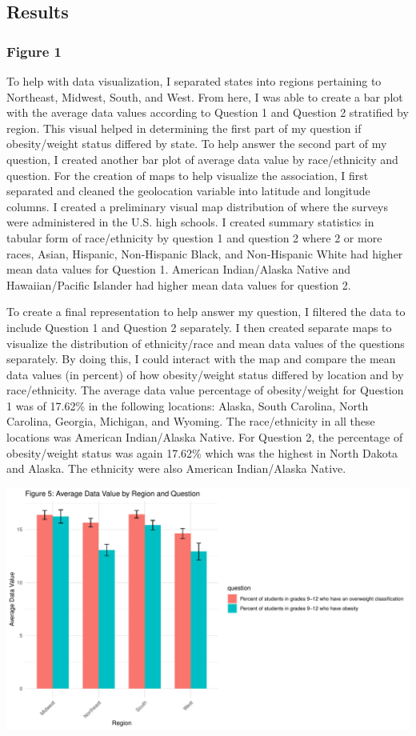 \documentclass[
  letterpaper,
  DIV=11,
  numbers=noendperiod]{scrartcl}
\begin{document}
\subsection{Results}\label{results}

\subsubsection{Figure 1}\label{figure-1}

To help with data visualization, I separated states into regions
pertaining to Northeast, Midwest, South, and West. From here, I was able
to create a bar plot with the average data values according to Question
1 and Question 2 stratified by region. This visual helped in determining
the first part of my question if obesity/weight status differed by
state. To help answer the second part of my question, I created another
bar plot of average data value by race/ethnicity and question. For the
creation of maps to help visualize the association, I first separated
and cleaned the geolocation variable into latitude and longitude
columns. I created a preliminary visual map distribution of where the
surveys were administered in the U.S. high schools. I created summary
statistics in tabular form of race/ethnicity by question 1 and question
2 where 2 or more races, Asian, Hispanic, Non-Hispanic Black, and
Non-Hispanic White had higher mean data values for Question 1. American
Indian/Alaska Native and Hawaiian/Pacific Islander had higher mean data
values for question 2.

To create a final representation to help answer my question, I filtered
the data to include Question 1 and Question 2 separately. I then created
separate maps to visualize the distribution of ethnicity/race and mean
data values of the questions separately. By doing this, I could interact
with the map and compare the mean data values (in percent) of how
obesity/weight status differed by location and by race/ethnicity. The
average data value percentage of obesity/weight for Question 1 was of
17.62\% in the following locations: Alaska, South Carolina, North
Carolina, Georgia, Michigan, and Wyoming. The race/ethnicity in all
these locations was American Indian/Alaska Native. For Question 2, the
percentage of obesity/weight status was again 17.62\% which was the
highest in North Dakota and Alaska. The ethnicity were also American
Indian/Alaska Native.

\includegraphics{PM566---Final_files/figure-pdf/unnamed-chunk-27-1.pdf}
\end{document}
